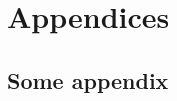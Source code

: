 
\section*{Appendices} %
\label{sec:appendices}

\appendix

\renewcommand{\thesubsection}{\Alph{subsection}}

\subsection{Some appendix} %
\label{sub:some-appendix}

\lipsum[1]
